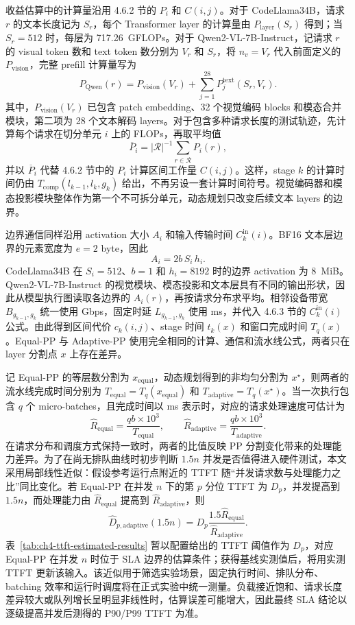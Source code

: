 收益估算中的计算量沿用 4.6.2 节的 \(P_i\) 和 \(C(i,j)\)。对于 CodeLlama34B，请求 \(r\) 的文本长度记为 \(S_r\)，每个 Transformer layer 的计算量由 \(P_{\mathrm{layer}}(S_r)\) 得到；当 \(S_r=512\) 时，每层为 717.26~GFLOPs。对于 Qwen2-VL-7B-Instruct，记请求 \(r\) 的 visual token 数和 text token 数分别为 \(V_r\) 和 \(S_r\)，将 \(n_v=V_r\) 代入前面定义的 \(P_{\mathrm{vision}}\)，完整 prefill 计算量写为
\[
P_{\mathrm{Qwen}}(r)=
P_{\mathrm{vision}}(V_r)
+\sum_{j=1}^{28}P_j^{\mathrm{text}}(S_r,V_r).
\]
其中，\(P_{\mathrm{vision}}(V_r)\) 已包含 patch embedding、32 个视觉编码 blocks 和模态合并模块，第二项为 28 个文本解码 layers。对于包含多种请求长度的测试轨迹，先计算每个请求在切分单元 \(i\) 上的 FLOPs，再取平均值
\[
\overline{P}_i=|\mathcal R|^{-1}
\sum_{r\in\mathcal R}P_i(r),
\]
并以 \(\overline{P}_i\) 代替 4.6.2 节中的 \(P_i\) 计算区间工作量 \(C(i,j)\)。这样，stage \(k\) 的计算时间仍由 \(T_{\mathrm{comp}}(l_{k-1},l_k,g_k)\) 给出，不再另设一套计算时间符号。视觉编码器和模态投影模块整体作为第一个不可拆分单元，动态规划只改变后续文本 layers 的边界。

边界通信同样沿用 activation 大小 \(A_i\) 和输入传输时间 \(C_k^{\mathrm{in}}(i)\)。BF16 文本层边界的元素宽度为 \(e=2\) byte，因此
\[
A_i=2b\,S_i\,h_i.
\]
CodeLlama34B 在 \(S_i=512\)、\(b=1\) 和 \(h_i=8192\) 时的边界 activation 为 8~MiB。Qwen2-VL-7B-Instruct 的视觉模块、模态投影和文本层具有不同的输出形状，因此从模型执行图读取各边界的 \(A_i(r)\)，再按请求分布求平均。相邻设备带宽 \(B_{g_{k-1},g_k}\) 统一使用 Gbps，固定时延 \(L_{g_{k-1},g_k}\) 使用 ms，并代入 4.6.3 节的 \(C_k^{\mathrm{in}}(i)\) 公式。由此得到区间代价 \(c_k(i,j)\)、stage 时间 \(t_k(x)\) 和窗口完成时间 \(T_q(x)\)。Equal-PP 与 Adaptive-PP 使用完全相同的计算、通信和流水线公式，两者只在 layer 分割点 \(x\) 上存在差异。

记 Equal-PP 的等层数分割为 \(x_{\mathrm{equal}}\)，动态规划得到的非均匀分割为 \(x^\star\)，则两者的流水线完成时间分别为 \(T_{\mathrm{equal}}=T_q(x_{\mathrm{equal}})\) 和 \(T_{\mathrm{adaptive}}=T_q(x^\star)\)。当一次执行包含 \(q\) 个 micro-batches，且完成时间以 ms 表示时，对应的请求处理速度可估计为
\[
\widehat R_{\mathrm{equal}}=\frac{qb\times10^3}{T_{\mathrm{equal}}},
\qquad
\widehat R_{\mathrm{adaptive}}=\frac{qb\times10^3}{T_{\mathrm{adaptive}}}.
\]
在请求分布和调度方式保持一致时，两者的比值反映 PP 分割变化带来的处理能力差异。为了在尚无排队曲线时初步判断 \(1.5n\) 并发是否值得进入硬件测试，本文采用局部线性近似：假设参考运行点附近的 TTFT 随“并发请求数与处理能力之比”同比变化。若 Equal-PP 在并发 \(n\) 下的第 \(p\) 分位 TTFT 为 \(D_p\)，并发提高到 \(1.5n\)，而处理能力由 \(\widehat R_{\mathrm{equal}}\) 提高到 \(\widehat R_{\mathrm{adaptive}}\)，则
\[
\widehat D_{p,\mathrm{adaptive}}(1.5n)
=D_p\frac{1.5\widehat R_{\mathrm{equal}}}
{\widehat R_{\mathrm{adaptive}}}.
\]
表~\ref{tab:ch4-ttft-estimated-results} 暂以配置给出的 TTFT 阈值作为 \(D_p\)，对应 Equal-PP 在并发 \(n\) 时位于 SLA 边界的估算条件；获得基线实测值后，将用实测 TTFT 更新该输入。该近似用于筛选实验场景，固定执行时间、排队分布、batching 效率和运行时调度将在正式实验中统一测量。负载接近饱和、请求长度差异较大或队列增长呈明显非线性时，估算误差可能增大，因此最终 SLA 结论以逐级提高并发后测得的 P90/P99 TTFT 为准。

